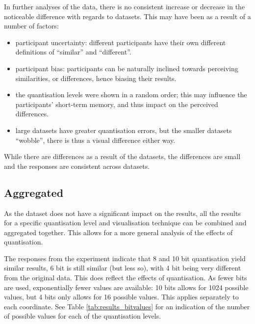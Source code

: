 In further analyses of the data, there is no consistent increase or decrease in
the noticeable difference with regards to datasets. This may have been as a
result of a number of factors: \begin{itemize}

  \item participant uncertainty: different participants have their own
  different definitions of ``similar'' and ``different''.

  \item participant bias: participants can be naturally inclined towards
  perceiving similarities, or differences, hence biasing their results.

  \item the quantisation levels were shown in a random order; this may
  influence the participants' short-term memory, and thus impact on the
  perceived differences.

  \item large datasets have greater quantisation errors, but the smaller
  datasets ``wobble'', there is thus a visual difference either way.

\end{itemize}

While there are differences as a result of the datasets, the differences are
small and the responses are consistent across datasets.


\subsection*{Aggregated}
\label{sub:results_discussion_aggregated}

As the dataset does not have a significant impact on the results, all the
results for a specific quantisation level and visualisation technique can be
combined and aggregated together. This allows for a more general analysis of
the effects of quantisation.

The responses from the experiment indicate that 8 and 10 bit quantisation yield
similar results, 6 bit is still similar (but less so), with 4 bit being very
different from the original data. This does reflect the effects of
quantisation. As fewer bits are used, exponentially fewer values are available:
10 bits allows for 1024 possible values, but 4 bits only allows for 16 possible
values. This applies separately to each coordinate. See Table
\ref{tab:results_bitvalues} for an indication of the number of possible values
for each of the quantisation levels.

